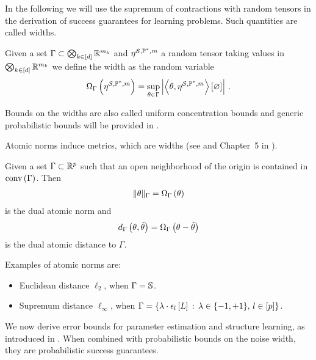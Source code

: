 In the following we will use the supremum of contractions with random tensors in the derivation of success guarantees for learning problems.
Such quantities are called widths.

\begin{definition}
    \label{def:width}
    Given a set $\Gamma\subset\bigotimes_{k\in[d]} \mathbb{R}^{m_{k}}$ and $\eta^{\mathcal{S},\mathbb{P}^*,m}$ a random tensor taking values in $\bigotimes_{k\in[d]} \mathbb{R}^{m_{k}}$ we define the width as the random variable
    \begin{align*}
        \Omega_{\Gamma}\left(\eta^{\mathcal{S},\mathbb{P}^*,m}\right) = \sup_{\theta\in\Gamma} \left|\left\langle \theta,\eta^{\mathcal{S},\mathbb{P}^*,m}\right\rangle \left[ \varnothing \right]\right| \, .
    \end{align*}
\end{definition}

Bounds on the widths are also called uniform concentration bounds \cite{goesmann_uniform_2021} and generic probabilistic bounds will be provided in .

Atomic norms induce metrics, which are widths (see \cite{chandrasekaran_convex_2012} and Chapter~5 in \cite{goesmann_uniform_2021}).

\begin{definition}
    Given a set $\Gamma\subset\mathbb{R}^{p}$ such that an open neighborhood of the origin is contained in $\mathrm{conv}\left(\Gamma\right)$.
    Then
    \begin{align*}
        \|\theta\|_{\Gamma} = \Omega_{\Gamma}\left(\theta\right)
    \end{align*}
    is the dual atomic norm and
    \begin{align*}
        d_{\Gamma}\left(\theta,\tilde{\theta}\right) = \Omega_{\Gamma}\left(\theta-\tilde{\theta}\right)
    \end{align*}
    is the dual atomic distance to $\Gamma$.
\end{definition}

Examples of atomic norms are:
\begin{itemize}
    \item Euclidean distance $\ell_2$, when $\Gamma=\mathbb{S}$.
    \item Supremum distance $\ell_{\infty}$, when $\Gamma=\{\lambda\cdot \epsilon_{l}\left[L\right] \,:\, \lambda\in\{-1,+1\},\, l\in[p]\}$.
\end{itemize}



We now derive error bounds for parameter estimation and structure learning, as introduced in .
When combined with probabilistic bounds on the noise width, they are probabilistic success guarantees.

